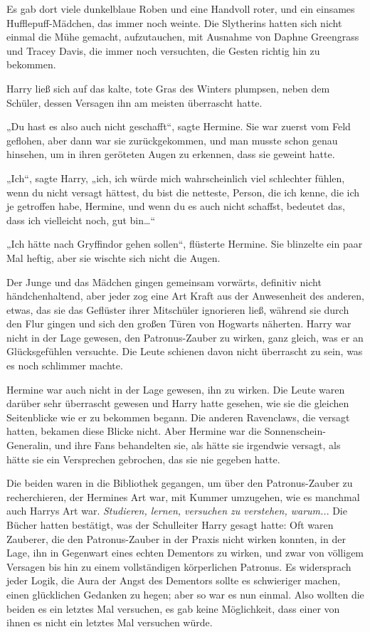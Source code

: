 {Es gab dort viele dunkelblaue Roben und eine Handvoll roter, und ein einsames Hufflepuff-Mädchen, das immer noch weinte. Die Slytherins hatten sich nicht einmal die Mühe gemacht, aufzutauchen, mit Ausnahme von Daphne Greengrass und Tracey Davis, die immer noch versuchten, die Gesten richtig hin zu bekommen.

Harry ließ sich auf das kalte, tote Gras des Winters plumpsen, neben dem Schüler, dessen Versagen ihn am meisten überrascht hatte.

„Du hast es also auch nicht geschafft“, sagte Hermine. Sie war zuerst vom Feld geflohen, aber dann war sie zurückgekommen, und man musste schon genau hinsehen, um in ihren geröteten Augen zu erkennen, dass sie geweint hatte.

„Ich“, sagte Harry, „ich, ich würde mich wahrscheinlich viel schlechter fühlen, wenn du nicht versagt hättest, du bist die netteste, Person, die ich kenne, die ich je getroffen habe, Hermine, und wenn du es auch nicht schaffst, bedeutet das, dass ich vielleicht noch, gut bin…“

„Ich hätte nach Gryffindor gehen sollen“, flüsterte Hermine. Sie blinzelte ein paar Mal heftig, aber sie wischte sich nicht die Augen.

Der Junge und das Mädchen gingen gemeinsam vorwärts, definitiv nicht händchenhaltend, aber jeder zog eine Art Kraft aus der Anwesenheit des anderen, etwas, das sie das Geflüster ihrer Mitschüler ignorieren ließ, während sie durch den Flur gingen und sich den großen Türen von Hogwarts näherten. Harry war nicht in der Lage gewesen, den Patronus-Zauber zu wirken, ganz gleich, was er an Glücksgefühlen versuchte. Die Leute schienen davon nicht überrascht zu sein, was es noch schlimmer machte.

Hermine war auch nicht in der Lage gewesen, ihn zu wirken. Die Leute waren darüber sehr überrascht gewesen und Harry hatte gesehen, wie sie die gleichen Seitenblicke wie er zu bekommen begann. Die anderen Ravenclaws, die versagt hatten, bekamen diese Blicke nicht. Aber Hermine war die Sonnenschein-Generalin, und ihre Fans behandelten sie, als hätte sie irgendwie versagt, als hätte sie ein Versprechen gebrochen, das sie nie gegeben hatte.

Die beiden waren in die Bibliothek gegangen, um über den Patronus-Zauber zu recherchieren, der Hermines Art war, mit Kummer umzugehen, wie es manchmal auch Harrys Art war. \emph{Studieren, lernen, versuchen zu verstehen, warum..}. Die Bücher hatten bestätigt, was der Schulleiter Harry gesagt hatte: Oft waren Zauberer, die den Patronus-Zauber in der Praxis nicht wirken konnten, in der Lage, ihn in Gegenwart eines echten Dementors zu wirken, und zwar von völligem Versagen bis hin zu einem vollständigen körperlichen Patronus. Es widersprach jeder Logik, die Aura der Angst des Dementors sollte es schwieriger machen, einen glücklichen Gedanken zu hegen; aber so war es nun einmal. Also wollten die beiden es ein letztes Mal versuchen, es gab keine Möglichkeit, dass einer von ihnen es nicht ein letztes Mal versuchen würde.

}
